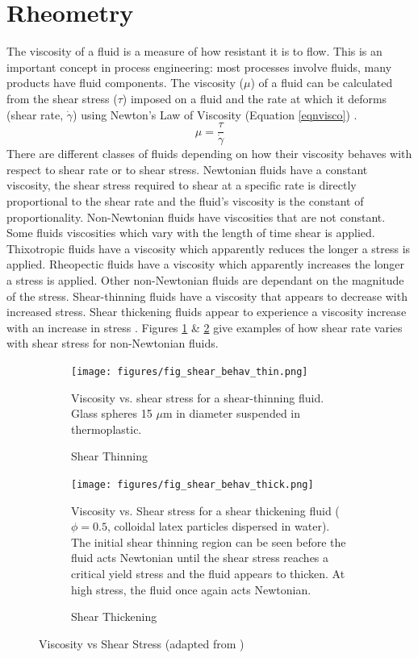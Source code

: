 \documentclass[twoside,a4]{report}
\def\br{\newline \newline \noindent}
\begin{document}
	\section*{Rheometry}
	The viscosity of a fluid is a measure of how resistant it is to flow. This is an important concept in process engineering: most processes involve fluids, many products have fluid components. The viscosity (\(\mu\)) of a fluid can be calculated from the shear stress (\(\tau\)) imposed on a fluid and the rate at which it deforms (shear rate, \(\dot{\gamma}\)) using Newton's Law of Viscosity (Equation \ref{eqnvisco}) \cite{backfluidmech}.
	\begin{equation}
	\mu = \frac{\tau}{\dot{\gamma}}
	\label{eqnvisco}
	\end{equation}
	There are different classes of fluids depending on how their viscosity behaves with respect to shear rate or to shear stress. Newtonian fluids have a constant viscosity, the shear stress required to shear at a specific rate is directly proportional to the shear rate and the fluid's viscosity is the constant of proportionality. Non-Newtonian fluids have viscosities that are not constant. Some fluids viscosities which vary with the length of time shear is applied. Thixotropic fluids have a viscosity which apparently reduces the longer a stress is applied. Rheopectic fluids have a viscosity which apparently increases the longer a stress is applied. Other non-Newtonian fluids are dependant on the magnitude of the stress. Shear-thinning fluids have a viscosity that appears to decrease with increased stress. Shear thickening fluids appear to experience a viscosity increase with an increase in stress \cite{backtypesofnonnewt}. Figures \ref{figshearthin} \& \ref{figshearthick} give examples of how shear rate varies with shear stress for non-Newtonian fluids. 
	\br
	\begin{figure}[!htb]
		\centering
		\begin{subfigure}[t]{0.45\textwidth}
			\centering
			\texttt{[image: figures/fig\_shear\_behav\_thin.png]}
			\caption{Shear Thinning}
			\label{figshearthin}
			\footnotesize 
			Viscosity vs. shear stress for a shear-thinning fluid. Glass spheres 15 $\mu$m in diameter suspended in thermoplastic.
		\end{subfigure}
		\begin{subfigure}[t]{0.45\textwidth}
			\centering
			\texttt{[image: figures/fig\_shear\_behav\_thick.png]}
			\caption{Shear Thickening}
			\label{figshearthick}
			\footnotesize 
			Viscosity vs. Shear stress for a shear thickening fluid ($\phi=0.5$, colloidal latex particles dispersed in water). The initial shear thinning region can be seen before the fluid acts Newtonian until the shear stress reaches a critical yield stress and the fluid appears to thicken. At high stress, the fluid once again acts Newtonian.
		\end{subfigure}
		\label{figshearthinthick}
		\caption{Viscosity vs Shear Stress (adapted from \cite{figshearthin, figshearthick})}
	\end{figure}
	
\end{document}
